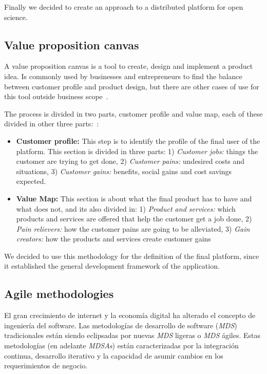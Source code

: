 Finally we decided to create an approach to a distributed platform for open
science.

\subsection{Value proposition canvas}


A value proposition canvas is a tool to create, design and implement a product
idea. Is commonly used by businesses and entrepreneurs to find the balance
between customer profile and product design, but there are other cases of use
for this tool outside business
scope~\cite{pokorna2015value,meertens2012mapping}.

The process is divided in two parts, customer profile and value map, each of
these divided in other three parts:~\cite{osterwalder2014value}:

\begin{itemize}
\item \textbf{Customer profile:} This step is to identify the profile of the
  final user of the platform. This section is divided in three parts: 1)
  \emph{Customer jobs:} things the customer are trying to get done, 2)
  \emph{Customer pains:} undesired costs and situations, 3) \emph{Customer
    gains:} benefits, social gains and cost savings expected.
\item \textbf{Value Map:} This section is about what the final product has to
  have and what does not, and its also divided in: 1) \emph{Product and
    services:} which products and services are offered that help the customer
  get a job done, 2) \emph{Pain relievers:} how the customer pains are going to
  be alleviated, 3) \emph{Gain creators:} how the products and services create
  customer gains
\end{itemize}

We decided to use this methodology for the definition of the final platform,
since it established the general development framework of the application.

\subsection{Agile methodologies} 

El gran crecimiento de internet y la economía digital ha alterado el concepto de
ingeniería del software. Las metodologías de desarrollo de software (\emph{MDS})
tradicionales están siendo eclipsadas por nuevas \emph{MDS} ligeras o \emph{MDS}
ágiles. Estas metodologías (en adelante \emph{MDSAs}) están caracterizadas por
la integración continua, desarrollo iterativo y la capacidad de asumir cambios
en los requerimientos de negocio.\cite{boehm2005management,livermore2008factors}


